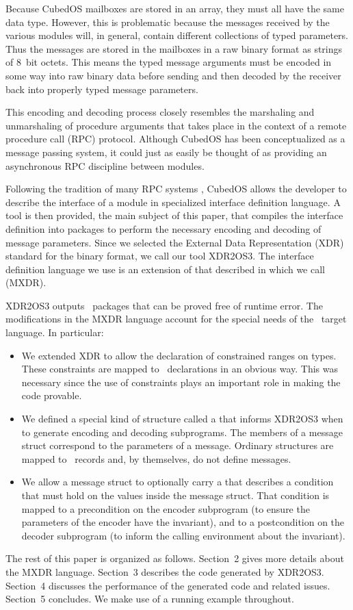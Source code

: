 Because CubedOS mailboxes are stored in an array, they must all have the same data type.
However, this is problematic because the messages received by the various modules will, in
general, contain different collections of typed parameters. Thus the messages are stored in the
mailboxes in a raw binary format as strings of 8~bit octets.  This means the typed message
arguments must be encoded in some way into raw binary data before sending and then decoded by
the receiver back into properly typed message parameters.

This encoding and decoding process closely resembles the marshaling and unmarshaling of
procedure arguments that takes place in the context of a remote procedure call (RPC) protocol.
Although CubedOS has been conceptualized as a message passing system, it could just as easily be
thought of as providing an asynchronous RPC discipline between modules.

Following the tradition of many RPC systems , CubedOS allows the
developer to describe the interface of a module in specialized interface definition language. A
tool is then provided, the main subject of this paper, that compiles the interface definition
into packages to perform the necessary encoding and decoding of message parameters. Since we
selected the External Data Representation (XDR) standard \cite{rfc-4506} for the binary format,
we call our tool XDR2OS3. The interface definition language we use is an extension of that
described in  which we call  (MXDR).

XDR2OS3 outputs \SPARK\ packages that can be proved free of runtime error. The modifications in
the MXDR language account for the special needs of the \SPARK\ target language. In particular:

\begin{itemize}
\item We extended XDR to allow the declaration of constrained ranges on types. These constraints
  are mapped to \SPARK\ declarations in an obvious way. This was necessary since the use of
  constraints plays an important role in making the code provable.

\item We defined a special kind of structure called a  that informs
  XDR2OS3 when to generate encoding and decoding subprograms. The members of a message struct
  correspond to the parameters of a message. Ordinary structures are mapped to \SPARK\ records
  and, by themselves, do not define messages.

\item We allow a message struct to optionally carry a  that describes
  a condition that must hold on the values inside the message struct. That condition is mapped
  to a precondition on the encoder subprogram (to ensure the parameters of the encoder have the
  invariant), and to a postcondition on the decoder subprogram (to inform the calling
  environment about the invariant).
\end{itemize}

The rest of this paper is organized as follows. Section~2 gives more details about the MXDR
language. Section~3 describes the code generated by XDR2OS3. Section~4 discusses the performance
of the generated code and related issues. Section~5 concludes. We make use of a running example
throughout.
